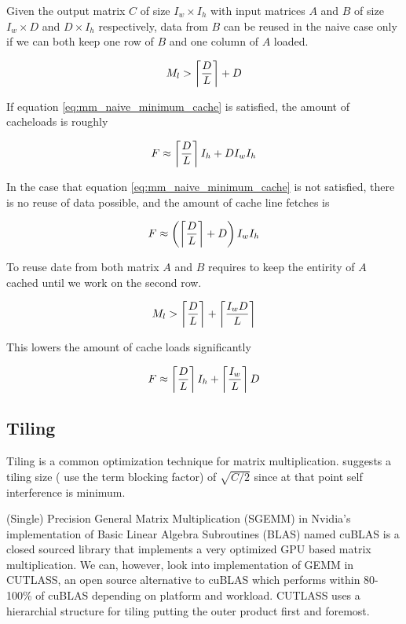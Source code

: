 Given the output matrix $C$ of size $I_w \times I_h$ with input matrices $A$ and $B$ of size $I_w \times D$ and $D \times I_h$ respectively, data from $B$ can be reused in the naive case only if we can both keep one row of $B$ and one column of $A$ loaded.

\begin{equation}
    \label{eq:mm_naive_minimum_cache}
    M_l > \left\lceil \frac{D}{L} \right\rceil + D
\end{equation}

\noindent
If equation \ref{eq:mm_naive_minimum_cache} is satisfied, the amount of cacheloads is roughly

\begin{equation}
    F \approx \left\lceil \frac{D}{L} \right\rceil I_h + D I_w I_h
\end{equation}

\noindent
In the case that equation \ref{eq:mm_naive_minimum_cache} is not satisfied, there is no reuse of data possible, and the amount of cache line fetches is

\begin{equation}
    F \approx \left( \left\lceil \frac{D}{L} \right\rceil + D \right) I_w I_h
\end{equation}

\noindent
To reuse date from both matrix $A$ and $B$ requires to keep the entirity of $A$ cached until we work on the second row.

\begin{equation}
    M_l > \left\lceil \frac{D}{L} \right\rceil + \left\lceil \frac{I_w D}{L} \right\rceil
\end{equation}

\noindent
This lowers the amount of cache loads significantly

\begin{equation}
    F \approx \left\lceil \frac{D}{L} \right\rceil I_h + \left\lceil \frac{I_w}{L} \right\rceil D
\end{equation}

\subsection{Tiling}
Tiling is a common optimization technique for matrix multiplication.
\citet{lam1991cache} suggests a tiling size (\citeauthor{lam1991cache} use the term blocking factor) of $\sqrt{C/2}$ since at that point self interference is minimum.

(Single) Precision General Matrix Multiplication (SGEMM) in Nvidia's implementation of Basic Linear Algebra Subroutines (BLAS) named cuBLAS is a closed sourced library that implements a very optimized GPU based matrix multiplication.
We can, however, look into implementation of GEMM in CUTLASS, an open source alternative to cuBLAS which performs within 80-100\% of cuBLAS depending on platform and workload.
CUTLASS uses a hierarchial structure for tiling putting the outer product first and foremost.